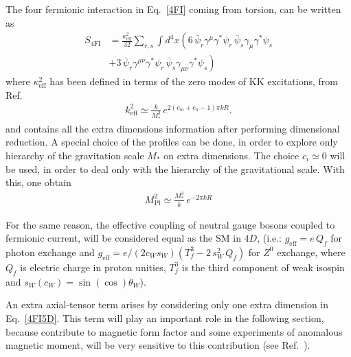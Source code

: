 The four fermionic interaction in Eq.~\eqref{4FI} coming from torsion, can be written as
\begin{align}
  \nonumber
  S_{4\text{FI}} &= \frac{\kappa_{\text{eff}}^2}{32}\sum_{r,s}\int d^4x\left(6\,\bar{\psi}_{r}\gamma^\mu\gamma^*\psi_{r}\,\bar{\psi}_{s}\gamma_\mu\gamma^*\psi_{s}\right.\\
  \label{4FI5D}
  &+\left. 3\,\bar{\psi}_r\gamma^{\mu\nu}\gamma^*\psi_r\,\bar{\psi}_s\gamma_{\mu\nu}\gamma^*\psi_s\right)
\end{align}
where $\kappa_{\text{eff}}^2$ has been defined in terms of the zero modes of KK excitations, from Ref.~\cite{Gherghetta:2006ha}
\begin{align}
  k_{\text{eff}}^2 \simeq \frac{k}{M_*^3}\,e^{2(c_m + c_n-1)\pi kR}.
\end{align}
and contains all the extra dimensions information after performing dimensional reduction. A special choice of the profiles can be done, in order to explore only hierarchy of the gravitation scale $M_*$ on extra dimensions. The choice $c_i\simeq0$ will be used, in order to deal only with the hierarchy of the gravitational scale. With this, one obtain
\begin{align}
  M_{\text{Pl}}^2 \simeq \frac{M_*^3}{k}\,e^{-2\pi kR}
\end{align}

For the same reason, the effective coupling of neutral gauge bosons coupled to fermionic current, will be considered equal as the SM in $4D$, (i.e.: $g_{\text{eff}} = e\,Q_f$ for photon exchange and $g_{\text{eff}} = e/(2c_Ws_W)\left(T^3_f - 2\,s_W^2\,Q_f\right)$ for $Z^0$ exchange, where $Q_f$ is electric charge in proton unities, $T_f^3$ is the third component of weak isospin and $s_W(c_W) = \sin(\cos)\theta_W$). 

An extra axial-tensor term arises by considering only one extra dimension in Eq.~\eqref{4FI5D}. This term will play an important role in the following section, because contribute to magnetic form factor and some experiments of anomalous magnetic moment, will be very sensitive to this contribution (see Ref.~\cite{Bennett:2004pv,Wong:2006nx,Hanneke:2008tm,Beda:2012zz}).



